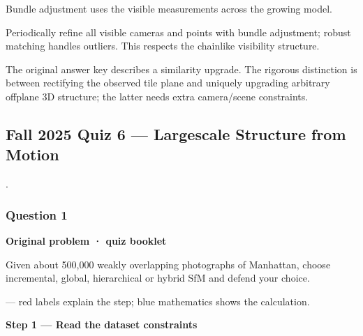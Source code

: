 \documentclass[letterpaper,11pt,english,openany,oneside]{jupyterBook}
\begin{document}
\sphinxAtStartPar
{} Bundle adjustment uses the visible measurements across the growing model.

\sphinxAtStartPar
Periodically refine all visible cameras and points with bundle adjustment; robust matching handles outliers. This respects the chain\sphinxhyphen{}like visibility structure.

\par

\sphinxAtStartPar
{} The original answer key describes a similarity upgrade. The rigorous distinction is between rectifying the observed tile plane and uniquely upgrading arbitrary off\sphinxhyphen{}plane 3D structure; the latter needs extra camera/scene constraints.


\subsection{Fall 2025 Quiz 6 — Large\sphinxhyphen{}scale Structure from Motion}
\label{\detokenize{lectures/lecture06/quiz-workbook:fall-2025-quiz-6-large-scale-structure-from-motion}}\label{\detokenize{lectures/lecture06/quiz-workbook:quiz-source-16}}
\sphinxAtStartPar
{} .


\subsubsection{Question 1}
\label{\detokenize{lectures/lecture06/quiz-workbook:question-1}}\label{\detokenize{lectures/lecture06/quiz-workbook:quiz-16-q1}}
\par\medskip\textbf{Original problem · quiz booklet}\par\smallskip

\sphinxAtStartPar
Given about 500,000 weakly overlapping photographs of Manhattan, choose incremental, global, hierarchical or hybrid SfM and defend your choice.

\par\medskip

\sphinxAtStartPar
{} — red labels explain the step; blue mathematics shows the calculation.

\par\medskip{}
{\color{QuizStepRed}\bfseries Step 1 — Read the dataset constraints}\par\smallskip
\end{document}
